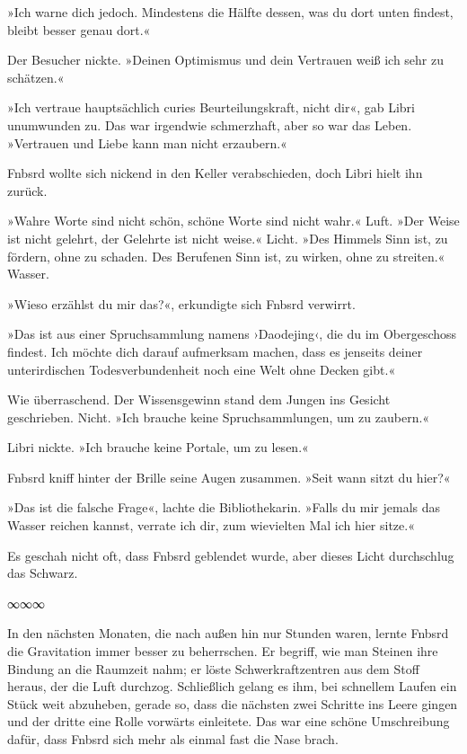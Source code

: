 »Ich warne dich jedoch. Mindestens die Hälfte dessen, was du dort unten findest, bleibt besser genau dort.«

Der Besucher nickte. »Deinen Optimismus und dein Vertrauen weiß ich sehr zu schätzen.«

»Ich vertraue hauptsächlich curies Beurteilungskraft, nicht dir«, gab Libri unumwunden zu. Das war irgendwie schmerzhaft, aber so war das Leben. »Vertrauen und Liebe kann man nicht erzaubern.«

Fnbsrd wollte sich nickend in den Keller verabschieden, doch Libri hielt ihn zurück.

»Wahre Worte sind nicht schön, schöne Worte sind nicht wahr.« Luft. »Der Weise ist nicht gelehrt, der Gelehrte ist nicht weise.« Licht. »Des Himmels Sinn ist, zu fördern, ohne zu schaden. Des Berufenen Sinn ist, zu wirken, ohne zu streiten.« Wasser.

»Wieso erzählst du mir das?«, erkundigte sich Fnbsrd verwirrt.

»Das ist aus einer Spruchsammlung namens ›Daodejing‹, die du im Obergeschoss findest. Ich möchte dich darauf aufmerksam machen, dass es jenseits deiner unterirdischen Todesverbundenheit noch eine Welt ohne Decken gibt.«

Wie überraschend. Der Wissensgewinn stand dem Jungen ins Gesicht geschrieben. Nicht. »Ich brauche keine Spruchsammlungen, um zu zaubern.«

Libri nickte. »Ich brauche keine Portale, um zu lesen.«

Fnbsrd kniff hinter der Brille seine Augen zusammen. »Seit wann sitzt du hier?«

»Das ist die falsche Frage«, lachte die Bibliothekarin. »Falls du mir jemals das Wasser reichen kannst, verrate ich dir, zum wievielten Mal ich hier sitze.«

Es geschah nicht oft, dass Fnbsrd geblendet wurde, aber dieses Licht durchschlug das Schwarz.

\begin{center}
∞∞∞
\end{center}

In den nächsten Monaten, die nach außen hin nur Stunden waren, lernte Fnbsrd die Gravitation immer besser zu beherrschen. Er begriff, wie man Steinen ihre Bindung an die Raumzeit nahm; er löste Schwerkraftzentren aus dem Stoff heraus, der die Luft durchzog. Schließlich gelang es ihm, bei schnellem Laufen ein Stück weit abzuheben, gerade so, dass die nächsten zwei Schritte ins Leere gingen und der dritte eine Rolle vorwärts einleitete. Das war eine schöne Umschreibung dafür, dass Fnbsrd sich mehr als einmal fast die Nase brach.

